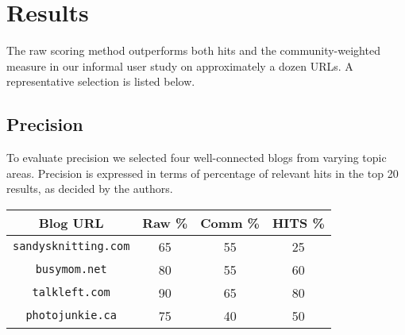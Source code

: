 \documentclass{sig-alternate}
\begin{document}




\section{Results}
The raw scoring method outperforms both hits and the community-weighted 
measure in our informal user study on approximately a dozen URLs.  A representative 
selection is listed below.
\subsection{Precision}
To evaluate precision we selected four well-connected blogs from
varying topic areas. Precision is expressed in terms of percentage of
relevant hits in the top 20 results, as decided by the authors.
\newline

\begin{tabular}{|c|c|c|c|}
\hline
Blog URL & Raw \% & Comm \% & HITS  \%\\
\hline
\texttt{sandysknitting.com} & 65 & 55 & 25 \\
\texttt{busymom.net} & 80 & 55 & 60 \\
\texttt{talkleft.com} & 90 & 65 & 80 \\
\texttt{photojunkie.ca} & 75 & 40 & 50 \\
\hline
\end{tabular}
\end{document}
